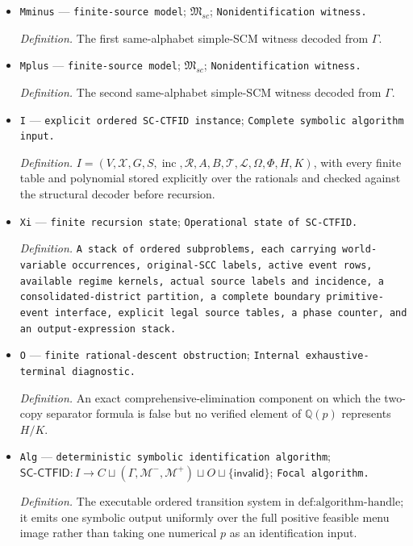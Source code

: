 \documentclass{article}
\begin{document}
\begin{itemize}
  \item \texttt{Mminus} --- \texttt{finite-\allowbreak{}source model}; \(\mathfrak M_{sc}\); \texttt{Nonidentification witness.}
  \par\smallskip\noindent\emph{Definition.} The first same-alphabet simple-SCM witness decoded from \(\Gamma\).
  \item \texttt{Mplus} --- \texttt{finite-\allowbreak{}source model}; \(\mathfrak M_{sc}\); \texttt{Nonidentification witness.}
  \par\smallskip\noindent\emph{Definition.} The second same-alphabet simple-SCM witness decoded from \(\Gamma\).
  \item \texttt{I} --- \texttt{explicit ordered SC-\allowbreak{}CTFID instance}; \texttt{Complete symbolic algorithm input.}
  \par\smallskip\noindent\emph{Definition.} \(I=(V,\mathcal X,G,S,\operatorname{inc},\mathcal R,A,B,\mathcal T,\mathcal L,\Omega,\Phi,H,K)\), with every finite table and polynomial stored explicitly over the rationals and checked against the structural decoder before recursion.
  \item \texttt{Xi} --- \texttt{finite recursion state}; \texttt{Operational state of SC-\allowbreak{}CTFID.}
  \par\smallskip\noindent\emph{Definition.} \texttt{A stack of ordered subproblems,\allowbreak{} each carrying world-\allowbreak{}variable occurrences,\allowbreak{} original-\allowbreak{}SCC labels,\allowbreak{} active event rows,\allowbreak{} available regime kernels,\allowbreak{} actual source labels and incidence,\allowbreak{} a consolidated-\allowbreak{}district partition,\allowbreak{} a complete boundary primitive-\allowbreak{}event interface,\allowbreak{} explicit legal source tables,\allowbreak{} a phase counter,\allowbreak{} and an output-\allowbreak{}expression stack.}
  \item \texttt{O} --- \texttt{finite rational-\allowbreak{}descent obstruction}; \texttt{Internal exhaustive-\allowbreak{}terminal diagnostic.}
  \par\smallskip\noindent\emph{Definition.} An exact comprehensive-elimination component on which the two-copy separator formula is false but no verified element of \(\mathbb Q(p)\) represents \(H/K\).
  \item \texttt{Alg} --- \texttt{deterministic symbolic identification algorithm}; \(\mathsf{SC\mbox{-}CTFID}:I\to C\sqcup(\Gamma,\mathcal M^-,\mathcal M^+)\sqcup O\sqcup\{\mathsf{invalid}\}\); \texttt{Focal algorithm.}
  \par\smallskip\noindent\emph{Definition.} The executable ordered transition system in \(\text{def:algorithm-handle}\); it emits one symbolic output uniformly over the full positive feasible menu image rather than taking one numerical \(p\) as an identification input.

\end{itemize}
\end{document}
